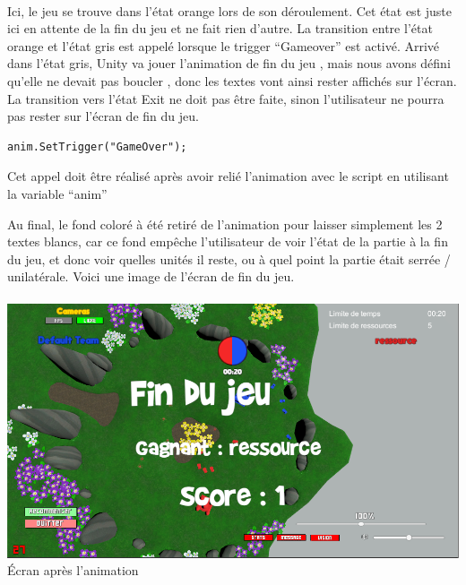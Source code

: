 \documentclass{report}
\begin{document}
\paragraph{}

Ici, le jeu se trouve dans l’état orange lors de son déroulement. Cet état est juste ici en attente de la fin du jeu et ne fait rien d’autre. 
La transition entre l’état orange et l’état gris est appelé lorsque le trigger “Gameover” est activé. Arrivé dans l’état gris, Unity va jouer l’animation de fin du jeu , mais nous avons défini qu’elle ne devait pas boucler , donc les textes vont ainsi rester affichés sur l’écran.
La transition vers l’état Exit ne doit pas être faite, sinon l’utilisateur ne pourra pas rester sur l’écran de fin du jeu.
\begin{lstlisting}[frame=single]
anim.SetTrigger("GameOver");
\end{lstlisting}

Cet appel doit être réalisé après avoir relié l’animation avec le script en utilisant la variable “anim”

Au final, le fond coloré à été retiré de l’animation pour laisser simplement les 2 textes blancs, car ce fond empêche l’utilisateur de voir l’état de la partie à la fin du jeu, et donc voir quelles unités il reste, ou à quel point la partie était serrée / unilatérale. Voici une image de l’écran de fin du jeu.
\paragraph{}
\begin{center}
\includegraphics[scale=0.5]{DATA/findujeu.png}
 {Écran après l’animation}
\end{center}
\paragraph{}
\end{document}
